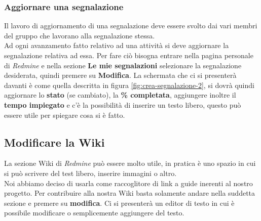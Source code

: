 \documentclass{scalatekids-article}
\begin{document}
\subsubsection{Aggiornare una segnalazione}
Il lavoro di aggiornamento di una segnalazione deve essere svolto dai vari membri del gruppo che lavorano alla segnalazione stessa.\\
Ad ogni avanzamento fatto relativo ad una attività si deve aggiornare la segnalazione relativa ad essa. Per fare ciò bisogna entrare nella pagina personale di \textit{Redmine} e nella sezione \textbf{Le mie segnalazioni} selezionare la segnalazione desiderata, quindi premere su \textbf{Modifica}.
La schermata che ci si presenterà davanti è come quella descritta in figura \ref{fig:crea-segnalazione-2}, si dovrà quindi aggiornare lo \textbf{stato} (se cambiato), la \textbf{\% completata}, aggiungere inoltre il \textbf{tempo impiegato} e c'è la possibilità di inserire un testo libero, questo può essere utile per spiegare cosa si è fatto.
\subsection{Modificare la Wiki}
La sezione Wiki di \textit{Redmine} può essere molto utile, in pratica è uno spazio in cui si può scrivere del test libero, inserire immagini o altro.\\
Noi abbiamo deciso di usarla come raccoglitore di link a guide inerenti al nostro progetto.
Per contribuire alla nostra Wiki basta solamente andare nella suddetta sezione e premere su \textbf{modifica}. Ci si presenterà un editor di testo in cui è possibile modificare o semplicemente aggiungere del testo.
\end{document}
